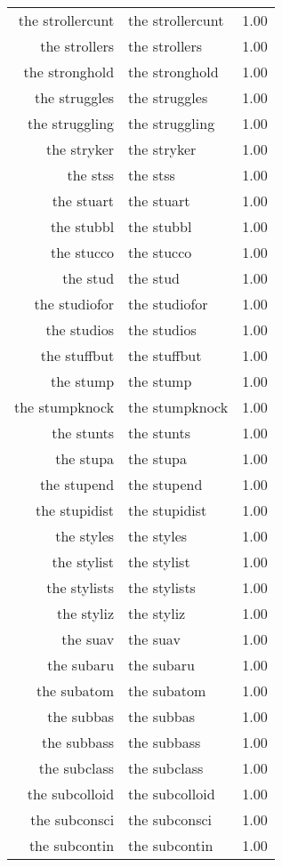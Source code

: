 \begin{table}[ht]
\begin{tabular}{rlr}
  the strollercunt & the strollercunt & 1.00 \\ 
  the strollers & the strollers & 1.00 \\ 
  the stronghold & the stronghold & 1.00 \\ 
  the struggles & the struggles & 1.00 \\ 
  the struggling & the struggling & 1.00 \\ 
  the stryker & the stryker & 1.00 \\ 
  the stss & the stss & 1.00 \\ 
  the stuart & the stuart & 1.00 \\ 
  the stubbl & the stubbl & 1.00 \\ 
  the stucco & the stucco & 1.00 \\ 
  the stud & the stud & 1.00 \\ 
  the studiofor & the studiofor & 1.00 \\ 
  the studios & the studios & 1.00 \\ 
  the stuffbut & the stuffbut & 1.00 \\ 
  the stump & the stump & 1.00 \\ 
  the stumpknock & the stumpknock & 1.00 \\ 
  the stunts & the stunts & 1.00 \\ 
  the stupa & the stupa & 1.00 \\ 
  the stupend & the stupend & 1.00 \\ 
  the stupidist & the stupidist & 1.00 \\ 
  the styles & the styles & 1.00 \\ 
  the stylist & the stylist & 1.00 \\ 
  the stylists & the stylists & 1.00 \\ 
  the styliz & the styliz & 1.00 \\ 
  the suav & the suav & 1.00 \\ 
  the subaru & the subaru & 1.00 \\ 
  the subatom & the subatom & 1.00 \\ 
  the subbas & the subbas & 1.00 \\ 
  the subbass & the subbass & 1.00 \\ 
  the subclass & the subclass & 1.00 \\ 
  the subcolloid & the subcolloid & 1.00 \\ 
  the subconsci & the subconsci & 1.00 \\ 
  the subcontin & the subcontin & 1.00 \\ 

\end{tabular}
\end{table}
